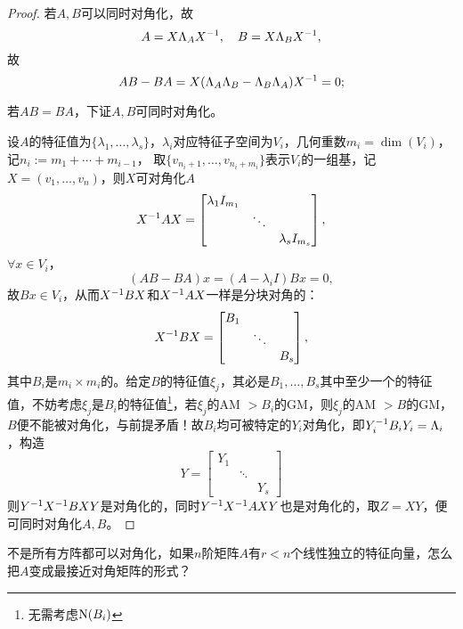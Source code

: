 \begin{proof}
	若$A,B$可以同时对角化，故
	\[
		A=X\Lambda_AX^{-1},\quad B=X\Lambda_BX^{-1},
	\]
	故
	\[
		AB-BA=X(\Lambda_A\Lambda_B-\Lambda_B\Lambda_A)X^{-1}=0;
	\]
	
	若$AB=BA$，下证$A,B$可同时对角化。
	
	设$A$的特征值为$\{\lambda_1,\ldots,\lambda_s\}$，$\lambda_i$对应特征子空间为$V_i$，几何重数$m_i=\dim(V_i)$，%
	记$n_i:=m_1+\cdots+m_{i-1}$，
	取$\{v_{n_i+1},\ldots,v_{n_i+m_i}\}$表示$V_i$的一组基，记$X=(v_1,\ldots,v_n)$，则$X$可对角化$A$
	\[
		X^{-1} AX=\begin{bmatrix}
			\lambda_1I_{m_1}\\ &\ddots\\ &&\lambda_sI_{m_s}
		\end{bmatrix},
	\]
	$\forall x\in V_i$，
	\[
		(AB-BA)x=(A-\lambda_iI)Bx=0,
	\]
	故$Bx\in V_i$，从而$X^{-1} BX$和$X^{-1} AX$一样是分块对角的：
	\[
		X^{-1} BX=\begin{bmatrix}
			B_1\\ &\ddots\\ &&B_s
		\end{bmatrix},
	\]
	其中$B_i$是$m_i\times m_i$的。给定$B$的特征值$\xi_j$，其必是$B_1,\ldots,B_s$其中至少一个的特征值，不妨考虑$\xi_j$是$B_i$的特征值\footnote{无需考虑$\operatorname{N}(B_i)$}，若$\xi_j$的AM $>B_i$的GM，则$\xi_j$的AM $>B$的GM，$B$便不能被对角化，与前提矛盾！故$B_i$均可被特定的$Y_i$对角化，即$Y_i^{-1} B_iY_i=\Lambda_i$，构造
	\[
		Y=\begin{bmatrix}
			Y_1\\ &\ddots\\ &&Y_s
		\end{bmatrix}
	\]
	则$Y^{-1} X^{-1} BXY$是对角化的，同时$Y^{-1} X^{-1} AXY$也是对角化的，取$Z=XY$，便可同时对角化$A,B$。
\end{proof}
不是所有方阵都可以对角化，如果$n$阶矩阵$A$有$r<n$个线性独立的特征向量，怎么把$A$变成最接近对角矩阵的形式？

